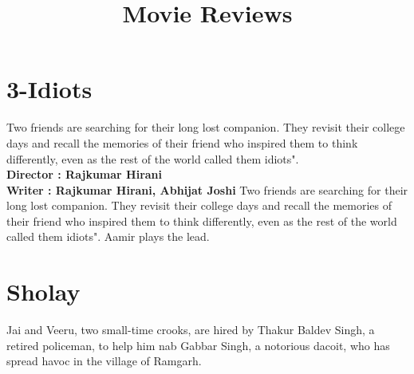 \documentclass{article}
\title{Movie Reviews}
\begin{document}
	\maketitle
	\section{3-Idiots}
	\large{Two friends are searching for their long lost companion. They revisit their college days and recall the memories of their friend who inspired them to think differently, even as the rest of the world called them idiots".}
\\
\textbf{Director : Rajkumar Hirani}
\\
\textbf{Writer : Rajkumar Hirani, Abhijat Joshi}
	\large{Two friends are searching for their long lost companion. They revisit their college days and recall the memories of their friend who inspired them to think differently, even as the rest of the world called them idiots". Aamir plays the lead.}
	\section{Sholay}
	\large{Jai and Veeru, two small-time crooks, are hired by Thakur Baldev Singh, a retired policeman, to help him nab Gabbar Singh, a notorious dacoit, who has spread havoc in the village of Ramgarh.}
\end{document}
